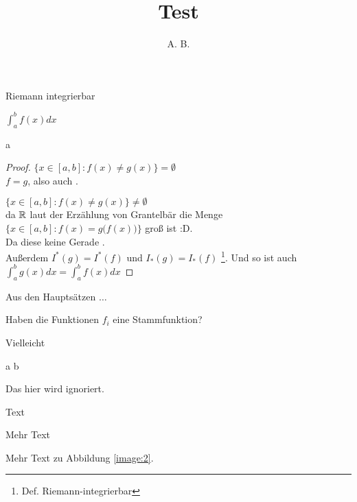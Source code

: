 \documentclass[]{article}
\title{Test}
\author{A. B.}
\begin{document}
\maketitle

\begin{task}{4}
	\begin{task-todo}
		\item Riemann integrierbar
		\item $\int_{a}^{b} f(x) dx$
	\end{task-todo}
	
	\begin{subtask}{a}
		\begin{proof}
			$\{ x \in [a,b]: f(x) \neq g(x) \} = \emptyset $ \\
			\Implies $f = g$, also auch .
			
			$\{ x \in [a,b]: f(x) \neq g(x) \} \neq \emptyset $ \\
			da $\mathbin{\mathbb{R}}$ laut der Erzählung von Grantelbär die Menge 
			$\big\{ x \in [a,b]: f(x) = g\big(f(x)\big) \big\}$ groß ist :D.\\
			
			Da diese keine Gerade .\\
			
			Außerdem $I^*(g) = I^*(f)$ und $I_*(g) = I_*(f)$ \footnote{Def. Riemann-integrierbar}.
			Und so ist auch $\int_{a}^{b} g(x) dx = \int_{a}^{b} f(x) dx$
		\end{proof}
	\end{subtask}
\end{task}

\begin{task}{3}
	\begin{remark}
		Aus den Hauptsätzen $\dots$
	\end{remark}

	\begin{task-todo}
		\item Haben die Funktionen $f_i$ eine Stammfunktion?
	\end{task-todo}

	Vielleicht
	\begin{Eq*}
		a \limplies b
	\end{Eq*}

	\begin{ignore}
		Das hier wird ignoriert.
	\end{ignore}

	Text
	
	
	Mehr Text
	
	
	Mehr Text zu Abbildung \ref{image:2}.
\end{task}
\end{document}
